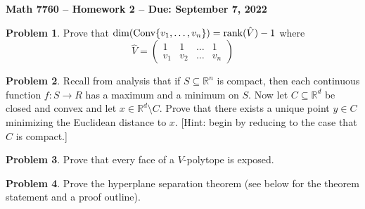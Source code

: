 \documentclass[letterpaper,11pt]{amsart}
\theoremstyle{plain}
\theoremstyle{definition}
\newtheorem{pr}{Problem}
\theoremstyle{remark}
\newcommand{\conv}{{\rm Conv}}
\newcommand{\rank}{{\rm rank}}
\begin{document}
\Large

\begin{center}
{\bf Math 7760 -- Homework  2 --  Due:  September 7, 2022}
\end{center}

\normalsize


\bigskip


\bigskip

\begin{pr}
    Prove that $\dim(\conv\{v_1,\dots,v_n\}) = \rank(\hat{V}) - 1$ where
    \[
        \hat{V} = \begin{pmatrix}
            1 & 1 & \dots & 1 \\
            v_1 & v_2 & \dots & v_n
        \end{pmatrix}
    \]
\end{pr}

\begin{pr}\label{convexNearest}
    Recall from analysis that if $S \subseteq \mathbb{R}^n$ is compact, then each continuous function $f: S \rightarrow R$
    has a maximum and a minimum on $S$.
    Now let $C\subseteq \mathbb{R}^d$ be closed and convex and let $x \in \mathbb{R}^d \setminus C$.
    Prove that there exists a unique point $y \in C$ minimizing the Euclidean distance to $x$.
    [Hint: begin by reducing to the case that $C$ is compact.]
\end{pr}

\begin{pr}
    Prove that every face of a $V$-polytope is exposed.
\end{pr}

\bigskip


\bigskip

\begin{pr}
    Prove the hyperplane separation theorem (see below for the theorem statement and a proof outline).
\end{pr}
\end{document}
